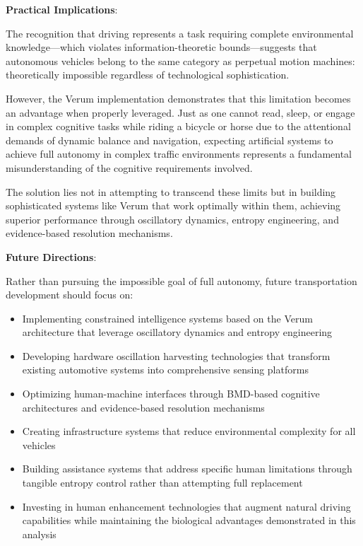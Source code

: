 \documentclass[12pt,a4paper]{article}
\begin{document}
\textbf{Practical Implications}:

The recognition that driving represents a task requiring complete environmental knowledge—which violates information-theoretic bounds—suggests that autonomous vehicles belong to the same category as perpetual motion machines: theoretically impossible regardless of technological sophistication.

However, the Verum implementation demonstrates that this limitation becomes an advantage when properly leveraged. Just as one cannot read, sleep, or engage in complex cognitive tasks while riding a bicycle or horse due to the attentional demands of dynamic balance and navigation, expecting artificial systems to achieve full autonomy in complex traffic environments represents a fundamental misunderstanding of the cognitive requirements involved.

The solution lies not in attempting to transcend these limits but in building sophisticated systems like Verum that work optimally within them, achieving superior performance through oscillatory dynamics, entropy engineering, and evidence-based resolution mechanisms.

\textbf{Future Directions}:

Rather than pursuing the impossible goal of full autonomy, future transportation development should focus on:

\begin{itemize}
\item Implementing constrained intelligence systems based on the Verum architecture that leverage oscillatory dynamics and entropy engineering
\item Developing hardware oscillation harvesting technologies that transform existing automotive systems into comprehensive sensing platforms
\item Optimizing human-machine interfaces through BMD-based cognitive architectures and evidence-based resolution mechanisms
\item Creating infrastructure systems that reduce environmental complexity for all vehicles
\item Building assistance systems that address specific human limitations through tangible entropy control rather than attempting full replacement
\item Investing in human enhancement technologies that augment natural driving capabilities while maintaining the biological advantages demonstrated in this analysis
\end{itemize}
\end{document}
